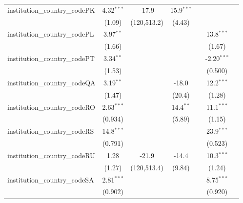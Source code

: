 \begin{tabular}{lcccccc}
   institution\_country\_codePK          & 4.32$^{***}$   & -17.9         & 15.9$^{***}$  &            &               &   \\   
                                         & (1.09)         & (120,513.2)   & (4.43)        &            &               &   \\   
   institution\_country\_codePL          & 3.97$^{**}$    &               &               &            & 13.8$^{***}$  &   \\   
                                         & (1.66)         &               &               &            & (1.67)        &   \\   
   institution\_country\_codePT          & 3.34$^{**}$    &               &               &            & -2.20$^{***}$ &   \\   
                                         & (1.53)         &               &               &            & (0.500)       &   \\   
   institution\_country\_codeQA          & 3.19$^{**}$    &               & -18.0         &            & 12.2$^{***}$  &   \\   
                                         & (1.47)         &               & (20.4)        &            & (1.28)        &   \\   
   institution\_country\_codeRO          & 2.63$^{***}$   &               & 14.4$^{**}$   &            & 11.1$^{***}$  &   \\   
                                         & (0.934)        &               & (5.89)        &            & (1.15)        &   \\   
   institution\_country\_codeRS          & 14.8$^{***}$   &               &               &            & 23.9$^{***}$  &   \\   
                                         & (0.791)        &               &               &            & (0.523)       &   \\   
   institution\_country\_codeRU          & 1.28           & -21.9         & -14.4         &            & 10.3$^{***}$  &   \\   
                                         & (1.27)         & (120,513.4)   & (9.84)        &            & (1.24)        &   \\   
   institution\_country\_codeSA          & 2.81$^{***}$   &               &               &            & 8.75$^{***}$  &   \\   
                                         & (0.902)        &               &               &            & (0.920)       &   \\   

\end{tabular}
